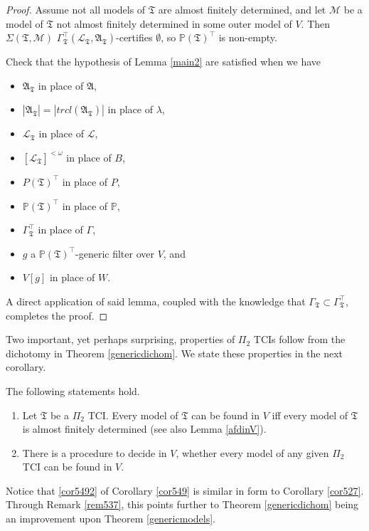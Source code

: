 \documentclass[12pt]{article}
\numberwithin{equation}{section}
\begin{document}
\begin{proof}
Assume not all models of $\mathfrak{T}$ are almost finitely determined, and let $\mathcal{M}$ be a model of $\mathfrak{T}$ not almost finitely determined in some outer model of $V$. Then $\Sigma(\mathfrak{T}, \mathcal{M})$ $\Gamma_{\mathfrak{T}}^{\top} (\mathcal{L}_{\mathfrak{T}}, \mathfrak{A}_{\mathfrak{T}})$-certifies $\emptyset$, so $\mathbb{P}(\mathfrak{T})^{\top}$ is non-empty.

Check that the hypothesis of Lemma \ref{main2} are satisfied when we have 
\begin{itemize}
    \item $\mathfrak{A}_{\mathfrak{T}}$ in place of $\mathfrak{A}$,
    \item $|\mathfrak{A}_{\mathfrak{T}}| = |trcl(\mathfrak{A}_{\mathfrak{T}})|$ in place of $\lambda$,
    \item $\mathcal{L}_{\mathfrak{T}}$ in place of $\mathcal{L}$,
    \item $[\mathcal{L}_{\mathfrak{T}}]^{< \omega}$ in place of $B$,
    \item $P(\mathfrak{T})^{\top}$ in place of $P$,
    \item $\mathbb{P}(\mathfrak{T})^{\top}$ in place of $\mathbb{P}$,
    \item $\Gamma_{\mathfrak{T}}^{\top}$ in place of $\Gamma$, 
    \item $g$ a $\mathbb{P}(\mathfrak{T})^{\top}$-generic filter over $V$, and
    \item $V[g]$ in place of $W$.
\end{itemize}
A direct application of said lemma, coupled with the knowledge that $\Gamma_{\mathfrak{T}} \subset \Gamma_{\mathfrak{T}}^{\top}$, completes the proof. 
\end{proof}

Two important, yet perhaps surprising, properties of $\Pi_2$ TCIs follow from the dichotomy in Theorem \ref{genericdichom}. We state these properties in the next corollary.

\begin{cor}\label{cor549}
The following statements hold.
\begin{enumerate}[label=(\arabic*)]
    \item Let $\mathfrak{T}$ be a $\Pi_2$ TCI. Every model of $\mathfrak{T}$ can be found in $V$ iff every model of $\mathfrak{T}$ is almost finitely determined (see also Lemma \ref{afdinV}).
    \item\label{cor5492} There is a procedure to decide in $V$, whether every model of any given $\Pi_2$ TCI can be found in $V$.
\end{enumerate}
\end{cor}
Notice that \ref{cor5492} of Corollary \ref{cor549} is similar in form to Corollary \ref{cor527}. Through Remark \ref{rem537}, this points further to Theorem \ref{genericdichom} being an improvement upon Theorem \ref{genericmodels}.
\end{document}
